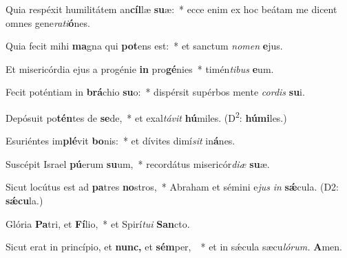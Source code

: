 \item Quia respéxit humilitátem an\textbf{cíl}læ \textbf{su}æ:~* ecce enim ex hoc beátam me dicent omnes gene\textit{rati}\textbf{ó}nes.
\item Quia fecit mihi \textbf{ma}gna qui \textbf{pot}ens est:~* et sanctum \textit{nomen} \textbf{e}jus.
\item Et misericórdia ejus a progénie \textbf{in} pro\textbf{gé}nies~* timén\textit{tibus} \textbf{e}um.
\item Fecit poténtiam in \textbf{brá}chio \textbf{su}o:~* dispérsit supérbos mente \textit{cordis} \textbf{su}i.
\item Depósuit po\textbf{tén}tes de \textbf{se}de,~* et exal\textit{távit} \textbf{hú}miles. (D\textsuperscript{2}: \textbf{húmi}les.)
\item Esuriéntes im\textbf{plé}vit \textbf{bo}nis:~* et dívites dimí\hspace*{0.02em}\textit{sit} in\textbf{á}nes.
\item Suscépit Israel \textbf{pú}erum \textbf{su}um,~* recordátus misericór\textit{diæ} \textbf{su}æ.
\item Sicut locútus est ad \textbf{pa}tres \textbf{no}stros,~* Abraham et sémini e\hspace*{0.02em}\textit{jus} \textit{in} \textbf{sǽ}cula. (D2: \textbf{sǽcu}la.)
\item Glória \textbf{Pa}tri, et \textbf{Fí}lio,~* et Spirí\tinyhspace\textit{tui} \textbf{San}cto.
\item Sicut erat in princípio, et \textbf{nunc,} et \textbf{sém}per, ~* et in sǽcula sæcu\tinyhspace\textit{lórum.} \textbf{A}men.